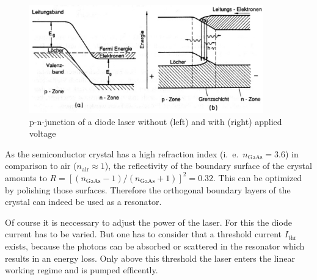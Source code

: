 \documentclass{protokoll_en}
\begin{document}
\begin{figure}[H]
	\centering
		\includegraphics[width=0.9\textwidth]{graphics/pn}
	\caption{p-n-junction of a diode laser without (left) and with (right) applied voltage~\cite{demtroed}}
	\label{fig:pn}
\end{figure}
As the semiconductor crystal has a high refraction index (i.\ e.\ $n_{\mathrm{GaAs}} = 3.6$) in comparison to air ($n_{\mathrm{air}} \approx 1$), the reflectivity of the boundary surface of the crystal amounts to $R=[(n_{\mathrm{GaAs}}-1)/(n_{\mathrm{GaAs}}+1)]^2 = 0.32$. This can be optimized by polishing those surfaces. Therefore the orthogonal boundary layers of the crystal can indeed be used as a resonator.

Of course it is neccessary to adjust the power of the laser. For this the diode current has to be varied. But one has to consider that a threshold current $I_{\mathrm{thr}}$ exists, because the photons can be absorbed or scattered in the resonator which results in an energy loss. Only above this threshold the laser enters the linear working regime and is pumped efficently.
\end{document}
